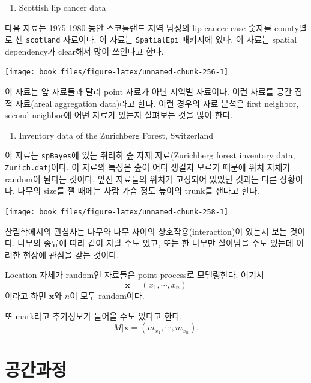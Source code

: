\documentclass[b5paper,]{scrbook}
\providecommand{\tightlist}{%
  \setlength{\itemsep}{0pt}\setlength{\parskip}{0pt}}
\theoremstyle{plain}
\theoremstyle{definition}
\numberwithin{equation}{section}
\begin{document}
\begin{enumerate}
\def\labelenumi{\arabic{enumi}.}
\setcounter{enumi}{2}
\tightlist
\item
  Scottish lip cancer data
\end{enumerate}

다음 자료는 1975-1980 동안 스코틀랜드 지역 남성의 lip cancer case 숫자를
county별로 센 \texttt{scotland} 자료이다. 이 자료는 \texttt{SpatialEpi}
패키지에 있다. 이 자료는 spatial dependency가 clear해서 많이 쓰인다고
한다.

\begin{center}\texttt{[image: book\_files/figure-latex/unnamed-chunk-256-1]} \end{center}

이 자료는 앞 자료들과 달리 point 자료가 아닌 지역별 자료이다. 이런
자료를 공간 집적 자료(areal aggregation data)라고 한다. 이런 경우의 자료
분석은 first neighbor, second neighbor에 어떤 자료가 있는지 살펴보는
것을 많이 한다.

\begin{enumerate}
\def\labelenumi{\arabic{enumi}.}
\setcounter{enumi}{3}
\tightlist
\item
  Inventory data of the Zurichberg Forest, Switzerland
\end{enumerate}

이 자료는 \texttt{spBayes}에 있는 취리히 숲 자재 자료(Zurichberg forest
inventory data, \texttt{Zurich.dat})이다. 이 자료의 특징은 숲이 어디
생길지 모르기 때문에 위치 자체가 random이 된다는 것이다. 앞선 자료들의
위치가 고정되어 있었던 것과는 다른 상황이다. 나무의 size를 잴 때에는
사람 가슴 정도 높이의 trunk를 잰다고 한다.

\begin{center}\texttt{[image: book\_files/figure-latex/unnamed-chunk-258-1]} \end{center}

산림학에서의 관심사는 나무와 나무 사이의 상호작용(interaction)이 있는지
보는 것이다. 나무의 종류에 따라 같이 자랄 수도 있고, 또는 한 나무만
살아남을 수도 있는데 이러한 현상에 관심을 갖는 것이다.

Location 자체가 random인 자료들은 point process로 모델링한다. 여기서
\[\mathbf{x}=(x_{1}, \cdots , x_{n})\] 이라고 하면 \(\mathbf{x}\)와
\(n\)이 모두 random이다.

또 mark라고 추가정보가 들어올 수도 있다고 한다.
\[M|\mathbf{x}=(m_{x_{1}}, \cdots , m_{x_{n}}).\]

\chapter{공간과정}\label{spatialprocess}
\end{document}
